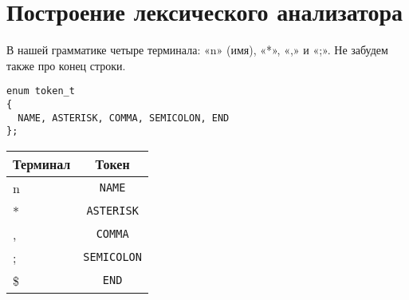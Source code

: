 \section{Построение лексического анализатора}

В нашей грамматике четыре терминала: «n» (имя), «*», «,»  и «;». Не забудем также про конец строки.

\begin{verbatim}
enum token_t
{
  NAME, ASTERISK, COMMA, SEMICOLON, END
};
\end{verbatim}

\begin{tabular}{| l | c |}
    \hline
    \textbf{Терминал} & \textbf{Токен} \\
    \hline
    n & \verb+NAME+ \\
    \hline
    * & \verb+ASTERISK+ \\
    \hline
    , & \verb+COMMA+ \\
    \hline
    ; & \verb+SEMICOLON+ \\
    \hline
    \$ & \verb+END+ \\
    \hline
\end{tabular}
